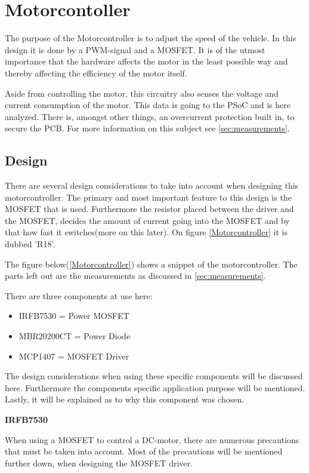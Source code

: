 \section{Motorcontoller}
The purpose of the Motorcontroller is to adjust the speed of the vehicle. In this design it is done by a PWM-signal and a MOSFET. It is of the utmost importance that the hardware affects the motor in the least possible way and thereby affecting the efficiency of the motor itself.

Aside from controlling the motor, this circuitry also senses the voltage and current consumption of the motor. This data is going to the PSoC and is here analyzed. There is, amongst other things, an overcurrent protection built in, to secure the PCB. For more information on this subject see \vref{sec:measurements}.

\subsection{Design}
There are several design considerations to take into account when designing this motorcontroller. The primary and most important feature to this design is the MOSFET that is used. Furthermore the resistor placed between the driver and the MOSFET, decides the amount of current going into the MOSFET and by that how fast it switches(more on this later). On figure \vref{Motorcontroller} it is dubbed 'R18'. 

The figure below(\vref{Motorcontroller}) shows a snippet of the motorcontroller. The parts left out are the measurements as discussed in \vref{sec:measurements}.

There are three components at use here:

\begin{itemize}
	\item{IRFB7530 = Power MOSFET}
	\item{MBR20200CT = Power Diode}
	\item{MCP1407 = MOSFET Driver}
\end{itemize}

The design considerations when using these specific components will be discussed here. Furthermore the components specific application purpose will be mentioned. Lastly, it will be explained as to why this component was chosen.  

\textbf{IRFB7530} 

When using a MOSFET to control a DC-motor, there are numerous precautions that must be taken into account. Most of the precautions will be mentioned further down, when designing the MOSFET driver. 


